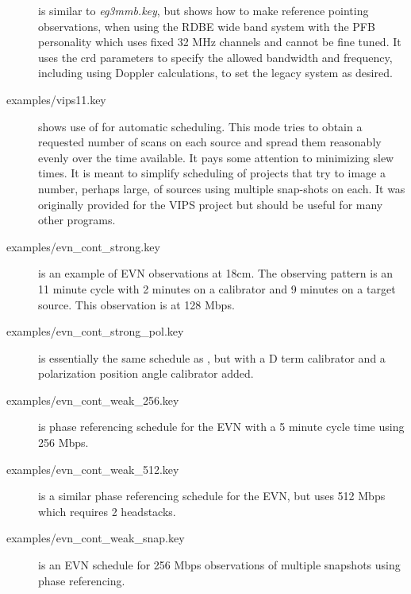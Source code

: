 \documentclass{report}
\begin{document}
\begin{description}
\item[]
is similar to {\sl eg3mmb.key}, but shows how to make reference
pointing observations, when using the RDBE wide band system with the
PFB personality which uses fixed 32 MHz channels and cannot be fine
tuned.  It uses the crd parameters to specify the allowed bandwidth
and frequency, including using Doppler calculations, to set the legacy
system as desired.


\item[ {examples/vips11.key}]
shows use of  for automatic
scheduling.  This mode tries to obtain a requested number of scans on
each source and spread them reasonably evenly over the time available.
It pays some attention to minimizing slew times.  It is meant to
simplify scheduling of projects that try to image a number, perhaps
large, of sources using multiple snap-shots on each.  It was
originally provided for the VIPS project but should be useful for many
other programs.

\item[
{examples/evn\_cont\_strong.key}] is an example of EVN observations at
18cm.  The observing pattern is an 11 minute cycle with 2 minutes on
a calibrator and 9 minutes on a target source.  This observation is at
128 Mbps.

\item[
{examples/evn\_cont\_strong\_pol.key}] is essentially the same
schedule as , but with a D
term calibrator and a polarization position angle calibrator added.

\item[
{examples/evn\_cont\_weak\_256.key}] is phase referencing schedule for
the EVN with a 5 minute cycle time using 256 Mbps.

\item[
{examples/evn\_cont\_weak\_512.key}] is a similar phase referencing schedule
for the EVN, but uses 512 Mbps which requires 2 headstacks.

\item[
{examples/evn\_cont\_weak\_snap.key}] is an EVN schedule for 256 Mbps
observations of multiple snapshots using phase referencing.


\end{description}
\end{document}
